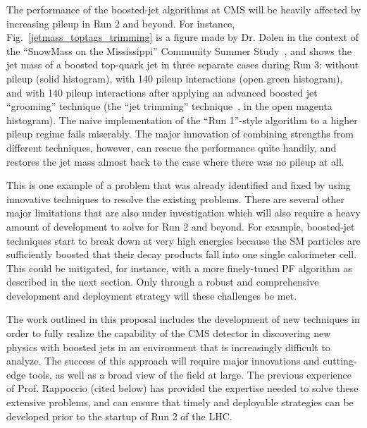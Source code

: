 \documentclass[12pt]{proposalnsf}
\begin{document}
The performance of the boosted-jet algorithms at CMS will be heavily
affected by increasing pileup in Run 2 and beyond. For instance,
Fig.~\ref{jetmass_toptags_trimming} is a figure made by Dr. Dolen in
the context of the ``SnowMass on the Mississippi'' Community Summer
Study~\cite{snowmass}, and shows the jet
mass of a boosted top-quark jet in three separate cases during Run 3: 
without pileup (solid histogram), with 140 pileup
interactions (open green histogram), and with 140 pileup
interactions after applying an advanced boosted jet ``grooming''
technique (the ``jet trimming'' technique~\cite{trimming}, in the open
magenta
histogram). The naive implementation of the
``Run 1''-style
algorithm to a higher pileup regime fails miserably. The major
innovation of combining strengths from different techniques, however,
can rescue the performance quite handily, and restores the jet mass
almost back to the case where there was no pileup at all. 

This is one example of a problem that was already identified and fixed
by using innovative techniques to resolve the existing problems. There
are several other major limitations that are also under investigation
which will also require a heavy amount of development to solve for Run
2 and beyond. For example, boosted-jet techniques start to break down
at very high energies because the SM particles are sufficiently
boosted that their decay products fall into one single calorimeter
cell. This could be mitigated, for instance, with a more finely-tuned
PF algorithm as described in the next section. Only through a robust
and comprehensive development and deployment strategy will these
challenges be met. 

The work outlined in this proposal includes the development of new
techniques in order to fully realize the
capability of the CMS detector in discovering new physics with boosted
jets in an environment that is increasingly difficult to analyze. The
success of this approach
will require major innovations and cutting-edge tools, as
well as a broad view of the field at large. The
previous experience of Prof. Rappoccio (cited below) has provided the expertise
needed to solve these extensive problems, and can ensure that timely
and deployable strategies can be developed prior to the startup of Run
2 of the LHC. 
\end{document}
